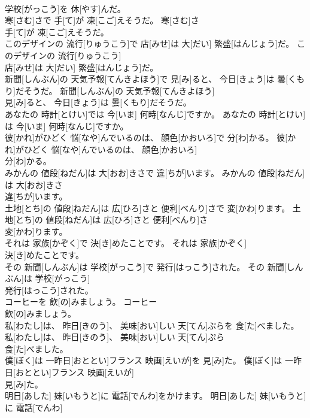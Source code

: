 \documentclass[8pt]{extreport}
\begin{document}
\begin{CJK}{UTF8}{min}
\\	学校[がっこう]を 休[やす]んだ。	
\\	寒[さむ]さで 手[て]が 凍[こご]えそうだ。	寒[さむ]さ
\\	手[て]が 凍[こご]えそうだ。	
\\	このデザインの 流行[りゅうこう]で 店[みせ]は 大[だい] 繁盛[はんじょう]だ。	このデザインの 流行[りゅうこう]
\\	店[みせ]は 大[だい] 繁盛[はんじょう]だ。	
\\	新聞[しんぶん]の 天気予報[てんきよほう]で 見[み]ると、 今日[きょう]は 曇[くもり]だそうだ。	新聞[しんぶん]の 天気予報[てんきよほう]
\\	見[み]ると、 今日[きょう]は 曇[くもり]だそうだ。	
\\	あなたの 時計[とけい]では 今[いま] 何時[なんじ]ですか。	あなたの 時計[とけい]
\\	は 今[いま] 何時[なんじ]ですか。	
\\	彼[かれ]がひどく 悩[なや]んでいるのは、 顔色[かおいろ]で 分[わ]かる。	彼[かれ]がひどく 悩[なや]んでいるのは、 顔色[かおいろ]
\\	分[わ]かる。	
\\	みかんの 値段[ねだん]は 大[おお]きさで 違[ちが]います。	みかんの 値段[ねだん]は 大[おお]きさ
\\	違[ちが]います。	
\\	土地[とち]の 値段[ねだん]は 広[ひろ]さと 便利[べんり]さで 変[かわ]ります。	土地[とち]の 値段[ねだん]は 広[ひろ]さと 便利[べんり]さ
\\	変[かわ]ります。	
\\	それは 家族[かぞく]で 決[き]めたことです。	それは 家族[かぞく]
\\	決[き]めたことです。	
\\	その 新聞[しんぶん]は 学校[がっこう]で 発行[はっこう]された。	その 新聞[しんぶん]は 学校[がっこう]
\\	発行[はっこう]された。	
\\	コーヒーを 飲[の]みましょう。	コーヒー
\\	飲[の]みましょう。	
\\	私[わたし]は、 昨日[きのう]、 美味[おい]しい 天[てん]ぷらを 食[た]べました。	私[わたし]は、 昨日[きのう]、 美味[おい]しい 天[てん]ぷら
\\	食[た]べました。	
\\	僕[ぼく]は 一昨日[おととい]フランス 映画[えいが]を 見[み]た。	僕[ぼく]は 一昨日[おととい]フランス 映画[えいが]
\\	見[み]た。	
\\	明日[あした] 妹[いもうと]に 電話[でんわ]をかけます。	明日[あした] 妹[いもうと]に 電話[でんわ]

\end{CJK}
\end{document}
